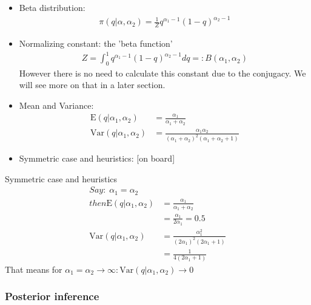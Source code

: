 \begin{itemize}
\item 
Beta distribution: 
\begin{align}
\pi(q| \alpha, \alpha_{2})= \frac{1}{Z}q^{\alpha_1-1} (1-q)^{\alpha_{2}-1}
\end{align}
\item Normalizing constant: the 'beta function'
\begin{align}
Z= \int_0^1 q^{\alpha_1-1} (1-q)^{\alpha_{2}-1} dq=: B(\alpha_1, \alpha_{2})
\end{align}
However there is no need to calculate this constant due to the conjugacy. We will see more on that in a later section.
\item Mean and Variance:
\begin{align}
\mbox{E}(q|\alpha_1,\alpha_{2})&= \frac{\alpha_1}{\alpha_1+\alpha_{2}}\\
\mbox{Var}(q|\alpha_1,\alpha_{2})&= \frac{\alpha_1\alpha_{2}}{(\alpha_1+\alpha_{2})^2(\alpha_1+\alpha_{2}+1)}
\end{align}
\item Symmetric case and heuristics:  [on board]
\end{itemize}

\begin{bbbox}{Symmetric case and heuristics}
\begin{align*}
	Say: \; \alpha_1 = \alpha_2 \\
	then \mbox{E}(q|\alpha_1,\alpha_{2})&= \frac{\alpha_1}{\alpha_1+\alpha_{2}}\\
	&= \frac{\alpha_1}{2 \alpha_1} = 0.5\\
	\mbox{Var}(q|\alpha_1,\alpha_{2})&= \frac{\alpha_1^2}{(2\alpha_1)^2(2\alpha_1 + 1)} \\
									 &= \frac{1}{4(2\alpha_1 + 1)}
\end{align*}
That means for $\alpha_1 = \alpha_2 \rightarrow \infty : \mbox{Var}(q|\alpha_1,\alpha_{2}) \rightarrow 0$
\end{bbbox}

\subsubsection{Posterior inference}

